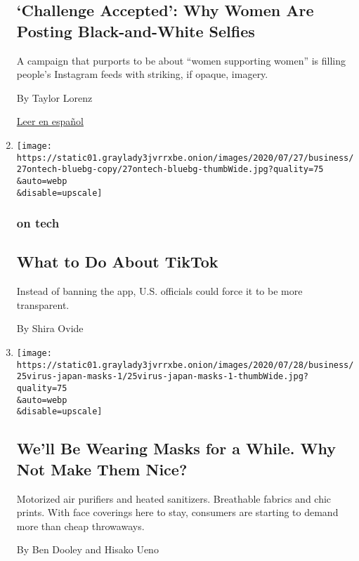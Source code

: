 \begin{enumerate}
  \hypertarget{challenge-accepted-why-women-are-posting-black-and-white-selfies}{%
  \subsection{`Challenge Accepted': Why Women Are Posting
  Black-and-White
  Selfies}\label{challenge-accepted-why-women-are-posting-black-and-white-selfies}}

  A campaign that purports to be about ``women supporting women'' is
  filling people's Instagram feeds with striking, if opaque, imagery.

  By Taylor Lorenz

  \href{https://www.nytimes3xbfgragh.onion/es/2020/07/28/espanol/estilos-de-vida/reto-selfi-blanco-negro.html}{Leer
  en español}
\item
  \href{/2020/07/27/technology/tiktok-data-privacy.html}{}

  \texttt{[image: https://static01.graylady3jvrrxbe.onion/images/2020/07/27/business/27ontech-bluebg-copy/27ontech-bluebg-thumbWide.jpg?quality=75\\\&auto=webp\\\&disable=upscale]}

  \hypertarget{on-tech-2}{%
  \subsubsection{on tech}\label{on-tech-2}}

  \hypertarget{what-to-do-about-tiktok}{%
  \subsection{What to Do About TikTok}\label{what-to-do-about-tiktok}}

  Instead of banning the app, U.S. officials could force it to be more
  transparent.

  By Shira Ovide
\item
  \href{/2020/07/27/business/fashion-masks-coronavirus.html}{}

  \texttt{[image: https://static01.graylady3jvrrxbe.onion/images/2020/07/28/business/25virus-japan-masks-1/25virus-japan-masks-1-thumbWide.jpg?quality=75\\\&auto=webp\\\&disable=upscale]}

  \hypertarget{well-be-wearing-masks-for-a-while-why-not-make-them-nice}{%
  \subsection{We'll Be Wearing Masks for a While. Why Not Make Them
  Nice?}\label{well-be-wearing-masks-for-a-while-why-not-make-them-nice}}

  Motorized air purifiers and heated sanitizers. Breathable fabrics and
  chic prints. With face coverings here to stay, consumers are starting
  to demand more than cheap throwaways.

  By Ben Dooley and Hisako Ueno
\end{enumerate}

